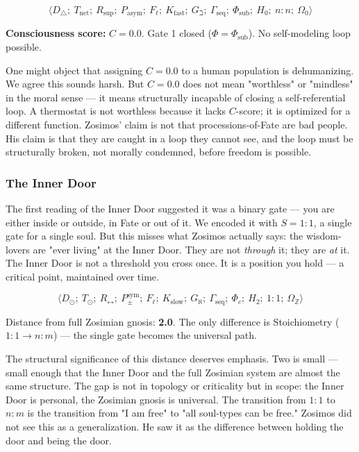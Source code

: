 \documentclass[12pt,a4paper]{article}
\begin{document}
\[\langle D_{\triangle};\ T_\text{net};\ R_\text{sup};\ P_\text{asym};\ F_{\ell};\ K_\text{fast};\ G_{\beth};\ \Gamma_\text{seq};\ \Phi_\text{sub};\ H_0;\ n:n;\ \Omega_0 \rangle\]

\textbf{Consciousness score:} $C = 0.0$. Gate 1 closed ($\Phi = \Phi_\text{sub}$). No self-modeling loop possible.

One might object that assigning $C = 0.0$ to a human population is dehumanizing. We agree this sounds harsh. But $C = 0.0$ does not mean "worthless" or "mindless" in the moral sense --- it means structurally incapable of closing a self-referential loop. A thermostat is not worthless because it lacks $C$-score; it is optimized for a different function. Zosimos' claim is not that processions-of-Fate are bad people. His claim is that they are caught in a loop they cannot see, and the loop must be structurally broken, not morally condemned, before freedom is possible.

\subsubsection{The Inner Door}

The first reading of the Inner Door suggested it was a binary gate --- you are either inside or outside, in Fate or out of it. We encoded it with $S = 1:1$, a single gate for a single soul. But this misses what Zosimos actually says: the wisdom-lovers are "ever living" at the Inner Door. They are not \emph{through} it; they are \emph{at} it. The Inner Door is not a threshold you cross once. It is a position you hold --- a critical point, maintained over time.

\[\langle D_{\odot};\ T_{\odot};\ R_{\leftrightarrow};\ P_{\pm}^{\text{sym}};\ F_{\ell};\ K_\text{slow};\ G_{\aleph};\ \Gamma_\text{seq};\ \Phi_c;\ H_2;\ 1:1;\ \Omega_\mathbb{Z} \rangle\]

Distance from full Zosimian gnosis: \textbf{2.0}. The only difference is Stoichiometry ($1:1 \to n:m$) --- the single gate becomes the universal path.

The structural significance of this distance deserves emphasis. Two is small --- small enough that the Inner Door and the full Zosimian system are almost the same structure. The gap is not in topology or criticality but in scope: the Inner Door is personal, the Zosimian gnosis is universal. The transition from $1:1$ to $n:m$ is the transition from "I am free" to "all soul-types can be free." Zosimos did not see this as a generalization. He saw it as the difference between holding the door and being the door.
\end{document}
